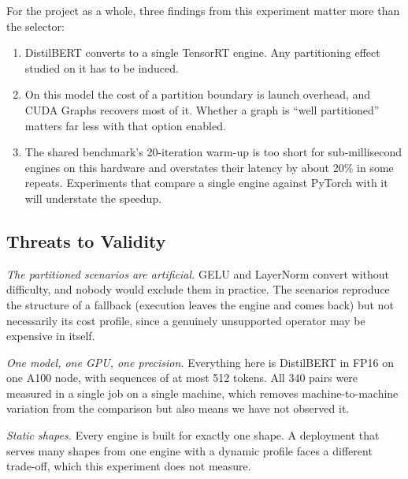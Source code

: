 For the project as a whole, three findings from this experiment matter more
than the selector:
\begin{enumerate}
  \item DistilBERT converts to a single TensorRT engine. Any partitioning
        effect studied on it has to be induced.
  \item On this model the cost of a partition boundary is launch overhead,
        and CUDA Graphs recovers most of it. Whether a graph is ``well
        partitioned'' matters far less with that option enabled.
  \item The shared benchmark's 20-iteration warm-up is too short for
        sub-millisecond engines on this hardware and overstates their latency
        by about 20\% in some repeats. Experiments that compare a single
        engine against PyTorch with it will understate the speedup.
\end{enumerate}

\subsection{Threats to Validity}
\label{sec:e4-threats}

\emph{The partitioned scenarios are artificial.} GELU and LayerNorm convert
without difficulty, and nobody would exclude them in practice. The scenarios
reproduce the structure of a fallback (execution leaves the engine and comes
back) but not necessarily its cost profile, since a genuinely unsupported
operator may be expensive in itself.

\emph{One model, one GPU, one precision.} Everything here is DistilBERT in
FP16 on one A100 node, with sequences of at most 512 tokens. All 340 pairs
were measured in a single job on a single machine, which removes
machine-to-machine variation from the comparison but also means we have not
observed it.

\emph{Static shapes.} Every engine is built for exactly one shape. A
deployment that serves many shapes from one engine with a dynamic profile
faces a different trade-off, which this experiment does not measure.

